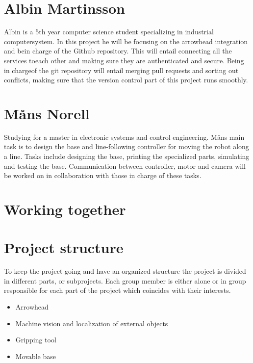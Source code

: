 \section*{Albin Martinsson}
Albin is a 5th year computer science student specializing in industrial computersystem. 
In this project he will be focusing on the arrowhead integration and bein charge of the Github repository.  
This will entail connecting all the services toeach other and making sure they are authenticated and secure.  
Being in chargeof the git repository will entail merging pull requests and sorting out conflicts,
making sure that the version control part of this project runs smoothly.


\section*{Måns Norell}
Studying for a master in electronic systems and control engineering.
Måns main task is to design the base and line-following controller for moving the robot along a line. 
Tasks include designing the base, printing the specialized parts, simulating and testing the base.
Communication between controller, motor and camera will be worked on in collaboration with those in charge of these tasks. 


\section{Working together}
\section*{Project structure}
To keep the project going and have an organized structure the project is divided 
in different parts, or subprojects. Each group member is either alone or in group responsible for each part of the project which coincides with their interests. 
\begin{itemize}
    \item Arrowhead
    \item Machine vision and localization of external objects
    \item Gripping tool
    \item Movable base
\end{itemize}

